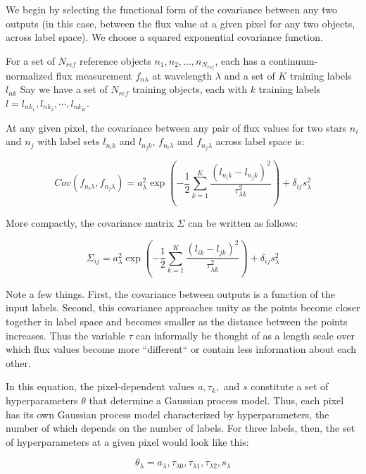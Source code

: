 \documentclass[12pt, preprint]{aastex}
\begin{document}
We begin by selecting the functional form of the covariance between any 
two outputs (in this case, between the flux value at a given pixel for any
two objects, across
label space). We choose a squared exponential covariance function. 

For a set of $N_{ref}$ reference objects $n_1, n_2, \dots, n_{N_{ref}}$, 
each has a continuum-normalized
flux measurement $f_{n \lambda}$ at wavelength $\lambda$ and a set of  
$K$ training labels $l_{nk}$ 
Say we have a set of $N_{ref}$ training objects, each with $k$ training labels 
$l = l_{nk_1}, l_{nk_2}, \cdots, l_{nk_K}$.

At any given pixel, the covariance between any pair of flux values for two
stars $n_i$ and $n_j$ with label sets $l_{n_i k}$ and $l_{n_j k}$, 
$ f_{n_i \lambda}$ and $f_{n_j \lambda}$ across label space is: 

\begin{equation}
  Cov(f_{n_i \lambda}, f_{n_j \lambda}) = 
  a_\lambda^2 \exp(-\frac{1}{2} 
  \sum_{k=1}^K \frac{(l_{n_i k}-l_{n_j k})^2}{\tau_{\lambda k}^2}) +
  \delta_{ij} s_\lambda^2
\end{equation}

More compactly, the covariance matrix $\Sigma$ can be written as follows:

\begin{equation}
  \Sigma_{ij} = 
  a_\lambda^2 \exp(-\frac{1}{2} 
  \sum_{k=1}^K \frac{(l_{i k}-l_{j k})^2}{\tau_{\lambda k}^2}) +
  \delta_{ij} s_\lambda^2
\end{equation}

Note a few things. First, the covariance between outputs is a function of the 
input labels. Second, this covariance approaches unity as the points become 
closer together in label space and becomes smaller as the distance between 
the points increases. Thus the variable $\tau$ can informally be thought of 
as a length scale over which flux values become more ``different`` or contain 
less information about each other.

In this equation, the pixel-dependent values $a, \tau_k, $ and $s$ constitute
a set of hyperparameters $\theta$ that determine a Gaussian process model. Thus, 
each pixel has its own Gaussian process model characterized by hyperparameters,
the number of which depends on the number of labels. For three labels, then,
the set of hyperparameters at a given pixel would look like this:

\begin{equation}
  \theta_\lambda = a_\lambda, 
  \tau_{\lambda 0}, \tau_{\lambda 1}, \tau_{\lambda 2}, s_\lambda
\end{equation}
\end{document}
